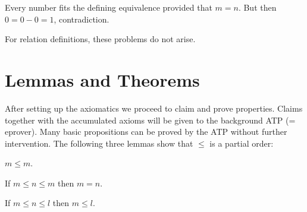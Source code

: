 \documentclass[11pt]{article}
\begin{document}
Every number fits the defining equivalence provided that $m = n$.
But then $0 = 0 - 0 = 1$, contradiction. 

For relation definitions, these problems do not arise.

\section{Lemmas and Theorems}

After setting up the axiomatics we proceed to claim and prove
properties. Claims together with the accumulated axioms will
be given to the background ATP (= eprover). Many basic
propositions can be proved by the ATP without further intervention.
The following three lemmas show that $\leq$ is a partial order:

\begin{forthel}

\begin{lemma} $m \leq m$.
\end{lemma}

\begin{lemma} If $m \leq n \leq m$ 
then $m = n$.
\end{lemma}

\begin{lemma} If $m \leq n \leq l$ 
then  $m \leq l$.
\end{lemma}
\end{forthel}
\end{document}
